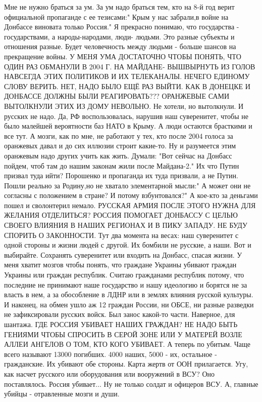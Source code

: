 \begin{itemize}
\begin{itemize}
 

Мне не нужно браться за ум. За ум надо браться тем, кто на 8-й год верит
официальной пропаганде с ее тезисами:" Крым у нас забрали,в войне на Донбассе
виновата только Россия." Я прекрасно понимаю, что государства - государствами,
а народы-народами, люди- людьми. Это разные субъекты и отношения разные. Будет
человечность между людьми - больше шансов на прекращение войны. У МЕНЯ УМА
ДОСТАТОЧНО ЧТОБЫ ПОНЯТЬ, ЧТО ОДИН РАЗ ОБМАНУЛИ В 2004 Г. НА МАЙДАНЕ- ВЫШВЫРНУТЬ
ИЗ ГОЛОВ НАВСЕГДА ЭТИХ ПОЛИТИКОВ И ИХ ТЕЛЕКАНАЛЫ. НЕЧЕГО ЕДИНОМУ СЛОВУ ВЕРИТЬ.
НЕТ, НАДО БЫЛО ЕЩЁ РАЗ ВЫЙТИ. КАК В ДОНЕЦКЕ И ДОНБАССЕ ДОЛЖНЫ БЫЛИ
РЕАГИРОВАТЬ??? ОРАНЖЕВЫЕ САМИ ВЫТОЛКНУЛИ ЭТИХ ИЗ ДОМУ НЕВОЛЬНО. Не хотели, но
вытолкнули. И русских не надо. Да, РФ воспользовалась, нарушив наш суверенитет,
чтобы не было малейшей вероятности баз НАТО в Крыму. А люди остаются брасткими
и все тут. А мозги, как по мне, не работают у тех, кто после 2004 голоса за
оранжевых давал и до сих иллюзии строит какие-то. Ну и разумеется этим
оранжевым надо других учить как жить. Думали: "Вот сейчас на Донбасс пойдем,
чтоб там до нашим законам жили после Майдана-2." Их что Путин призвал туда
ийти? Порошенко и пропаганда их туда призвали, а не Путин. Пошли реально за
Родину,но не хватало элементарной мысли:" А может они не согласны с положением
в стране? И потому взбунтовался?" А кое-кто за деньгами пошел и сволонтерил
немало. РУССКАЯ АРМИЯ ПОСЛЕ ЭТОГО НУЖНА ДЛЯ ЖЕЛАНИЯ ОТДЕЛИТЬСЯ? РОССИЯ ПОМОГАЕТ
ДОНБАССУ С ЦЕЛЬЮ СВОЕГО ВЛИЯНИЯ В НАШИХ РЕГИОНАХ И В ПИКУ ЗАПАДУ. НЕ БУДУ
СПОРИТЬ О ЗАКОННОСТИ. Тут два момента на весах: наш суверенитет с одной стороны
и жизни людей с другой. Их бомбили не русские, а наши. Вот и выбирайте.
Сохранять суверенитет или входить на Донбасс, спасая жизни. У меня хватит
мозгов чтобы понять, что граждане Украины убивают граждан Украины или граждан
республик. Считаю гражданами республик потому, что последние не принимают наше
государство и нашу идеологию и борятся не за власть в нем, а за обособление в
ЛДНР или в землях влияния русской культуры. И наконец, на обмен ушло аж 12
граждан России, ни ОБСЕ, ни разные разведки не зафиксировали русских войск. Был
занос какой-то части. Наверное, для шантажа. ГДЕ РОССИЯ УБИВАЕТ НАШИХ ГРАЖДАН?
НЕ НАДО БЫТЬ ГЕНИЯМИ ЧТОБЫ СПРОСИТЬ В СЕРОЙ ЗОНЕ ИЛИ У МАТЕРЕЙ ВОЗЛЕ АЛЛЕИ
АНГЕЛОВ О ТОМ, КТО КОГО УБИВАЕТ. А теперь по убитым. Чаще всего называют 13000
погибших. 4000 наших, 5000 - их, остальное - гражданские. Их убивают обе
стороны. Карта жертв от ООН прилагается. Угу, как насчет русского или
оборудования или вооружений в ВСУ? Оно поставлялось. Россия убивает... Ну не
только солдат и офицеров ВСУ. А, главные убийцы - отравленные мозги и души.


\end{itemize}
\end{itemize}

